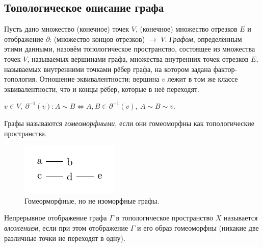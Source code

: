 \subsection{Топологическое описание графа}
\begin{definition}
    Пусть дано множество (конечное) точек $V$, (конечное) множество отрезков $E$ и отображение $\partial$: (множество концов отрезков) $\to$ $V$. \textit{Графом}, определённым этими данными, назовём топологическое пространство, состоящее из множества точек $V$, называемых вершинами графа, множества внутренних точек отрезков $E$, называемых внутренними точками рёбер графа, на котором задана фактор-топология. Отношение эквивалентности: вершина $v$ лежит в том же классе эквивалентности, что и концы рёбер, которые в неё переходят.
\end{definition}

$v \in V, \ \partial^{-1}(v): A \sim B \Leftrightarrow A, B \in \partial^{-1}(v), \ A \sim B \sim v$.

\begin{definition}
    Графы называются \textit{гомеоморфными}, если они гомеоморфны как топологические пространства.
\end{definition}

\begin{figure}[h]
    \centering
    \includegraphics[scale=2]{images/5.pdf}
    \caption{Гомеорморфные, но не изоморфные графы.}
    \label{fig:3}
\end{figure}

\begin{definition}
    Непрерывное отображение графа $\Gamma$ в топологическое пространство $X$ называется \textit{вложением}, если при этом отображение $\Gamma$ и его образ гомеоморфны (никакие две различные точки не переходят в одну).
\end{definition}

